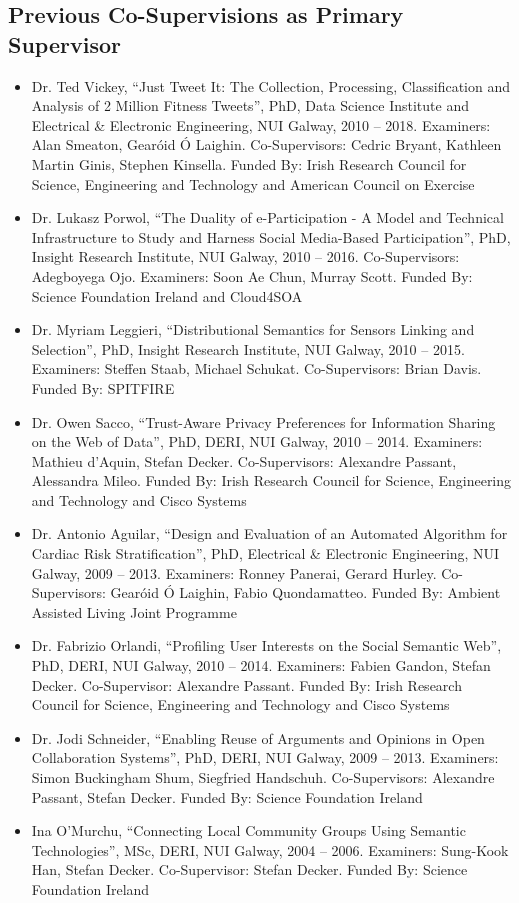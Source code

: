 \documentclass[10pt,a4paper]{res} %
\begin{document}
\begin{resume}
\subsection*{Previous Co-Supervisions as Primary Supervisor}

\begin{itemize} \itemsep -2pt
\item Dr. Ted Vickey, ``Just Tweet It: The Collection, Processing, Classification and Analysis of 2 Million Fitness Tweets'', PhD, Data Science Institute and Electrical \& Electronic Engineering, NUI Galway, 2010 -- 2018. Examiners: Alan Smeaton, Gear\'{o}id \'{O} Laighin. Co-Supervisors: Cedric Bryant, Kathleen Martin Ginis, Stephen Kinsella. Funded By: Irish Research Council for Science, Engineering and Technology and American Council on Exercise %
\item Dr. Lukasz Porwol, ``The Duality of e-Participation - A Model and Technical Infrastructure to Study and Harness Social Media-Based Participation'', PhD, Insight Research Institute, NUI Galway, 2010 -- 2016. Co-Supervisors: Adegboyega Ojo. Examiners: Soon Ae Chun, Murray Scott. Funded By: Science Foundation Ireland and Cloud4SOA
\item Dr. Myriam Leggieri, ``Distributional Semantics for Sensors Linking and Selection'', PhD, Insight Research Institute, NUI Galway, 2010 -- 2015. Examiners: Steffen Staab, Michael Schukat. Co-Supervisors: Brian Davis. Funded By: SPITFIRE %
\item Dr. Owen Sacco, ``Trust-Aware Privacy Preferences for Information Sharing on the Web of Data'', PhD, DERI, NUI Galway, 2010 -- 2014. Examiners: Mathieu d'Aquin, Stefan Decker. Co-Supervisors: Alexandre Passant, Alessandra Mileo. Funded By: Irish Research Council for Science, Engineering and Technology and Cisco Systems %
\item Dr. Antonio Aguilar, ``Design and Evaluation of an Automated Algorithm for Cardiac Risk Stratification'', PhD, Electrical \& Electronic Engineering, NUI Galway, 2009 -- 2013. Examiners: Ronney Panerai, Gerard Hurley. Co-Supervisors: Gear\'{o}id \'{O} Laighin, Fabio Quondamatteo. Funded By: Ambient Assisted Living Joint Programme %
\item Dr. Fabrizio Orlandi, ``Profiling User Interests on the Social Semantic Web'', PhD, DERI, NUI Galway, 2010 -- 2014. Examiners: Fabien Gandon, Stefan Decker. Co-Supervisor: Alexandre Passant. Funded By: Irish Research Council for Science, Engineering and Technology and Cisco Systems %
\item Dr. Jodi Schneider, ``Enabling Reuse of Arguments and Opinions in Open Collaboration Systems'', PhD, DERI, NUI Galway, 2009 -- 2013. Examiners: Simon Buckingham Shum, Siegfried Handschuh. Co-Supervisors: Alexandre Passant, Stefan Decker. Funded By: Science Foundation Ireland %
\item Ina O'Murchu, ``Connecting Local Community Groups Using Semantic Technologies'', MSc, DERI, NUI Galway, 2004 -- 2006. Examiners: Sung-Kook Han, Stefan Decker. Co-Supervisor: Stefan Decker. Funded By: Science Foundation Ireland
\end{itemize}


\end{resume}
\end{document}
